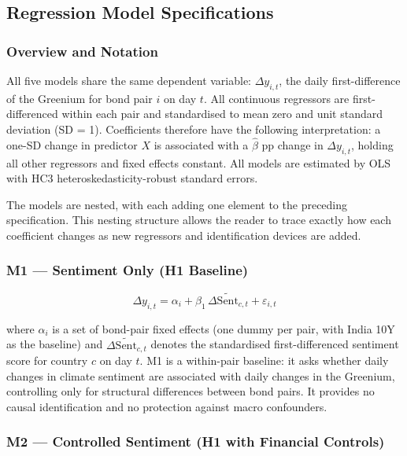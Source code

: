 \documentclass[12pt,a4paper]{article}
\begin{document}
\subsection{Regression Model Specifications}

\subsubsection{Overview and Notation}

All five models share the same dependent variable: $\Delta y_{i,t}$, the daily first-difference of the Greenium for bond pair $i$ on day $t$. All continuous regressors are first-differenced within each pair and standardised to mean zero and unit standard deviation (SD = 1). Coefficients therefore have the following interpretation: a one-SD change in predictor $X$ is associated with a $\hat{\beta}$ pp change in $\Delta y_{i,t}$, holding all other regressors and fixed effects constant. All models are estimated by OLS with HC3 heteroskedasticity-robust standard errors.

The models are nested, with each adding one element to the preceding specification. This nesting structure allows the reader to trace exactly how each coefficient changes as new regressors and identification devices are added.

\subsubsection{M1 --- Sentiment Only (H1 Baseline)}

\begin{equation}
\Delta y_{i,t} = \alpha_i + \beta_1 \,\Delta\widetilde{\text{Sent}}_{c,t} + \varepsilon_{i,t}
\label{eq:m1}
\end{equation}

\noindent where $\alpha_i$ is a set of bond-pair fixed effects (one dummy per pair, with India 10Y as the baseline) and $\Delta\widetilde{\text{Sent}}_{c,t}$ denotes the standardised first-differenced sentiment score for country $c$ on day $t$. M1 is a within-pair baseline: it asks whether daily changes in climate sentiment are associated with daily changes in the Greenium, controlling only for structural differences between bond pairs. It provides no causal identification and no protection against macro confounders.

\subsubsection{M2 --- Controlled Sentiment (H1 with Financial Controls)}
\end{document}
